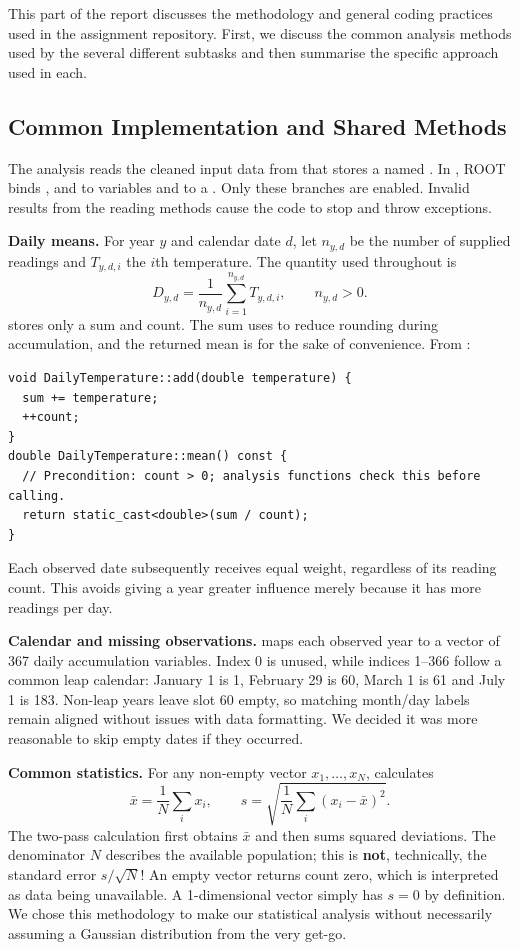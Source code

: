 

This part of the report discusses the methodology and general coding practices used in the assignment repository. First, we discuss the common analysis methods used by the several different subtasks and then summarise the specific approach used in each.

\subsection{Common Implementation and Shared Methods}
The analysis reads the cleaned input data from  that stores a  named . In , ROOT binds ,  and  to  variables and  to a . Only these branches are enabled. Invalid results from the reading methods cause the code to stop and throw exceptions.

\textbf{Daily means.} For year $y$ and calendar date $d$, let $n_{y,d}$ be the
number of supplied readings and $T_{y,d,i}$ the $i$th temperature. The quantity used
throughout is
\[
 D_{y,d}=\frac{1}{n_{y,d}}\sum_{i=1}^{n_{y,d}}T_{y,d,i},\qquad n_{y,d}>0.
\]
 stores only a sum and count. The sum uses  to reduce rounding during accumulation, and the returned mean is  for the sake of convenience. From :
\begin{lstlisting}
void DailyTemperature::add(double temperature) {
  sum += temperature;
  ++count;
}
double DailyTemperature::mean() const {
  // Precondition: count > 0; analysis functions check this before calling.
  return static_cast<double>(sum / count);
}
\end{lstlisting}
Each observed date subsequently receives equal weight, regardless of its reading
count. This avoids giving a year greater influence merely because it has more
readings per day.

\textbf{Calendar and missing observations.}  maps each
observed year to a vector of 367 daily accumulation variables. Index 0 is unused, while indices
1--366 follow a common leap calendar: January 1 is 1, February 29 is 60,
March 1 is 61 and July 1 is 183. Non-leap years leave slot 60 empty, so matching
month/day labels remain aligned without issues with data formatting.
We decided it was more reasonable to skip empty dates if they occurred.

\textbf{Common statistics.} For any non-empty vector $x_1,\ldots,x_N$,
 calculates
\[
 \bar x=\frac{1}{N}\sum_i x_i,\qquad
 s=\sqrt{\frac{1}{N}\sum_i(x_i-\bar x)^2}.
\]
The two-pass calculation first obtains $\bar x$ and then sums squared deviations.
The denominator $N$ describes the available population; this is \textbf{not}, technically, the standard error $s/\sqrt N$! An empty vector returns count zero, which is interpreted as data being unavailable. A 1-dimensional vector simply has $s =0$ by definition. We chose this methodology to make our statistical analysis without necessarily assuming a Gaussian distribution from the very get-go.

